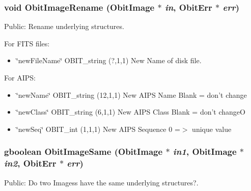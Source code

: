 \subsubsection{\setlength{\rightskip}{0pt plus 5cm}void Obit\-Image\-Rename ({\bf Obit\-Image} $\ast$ {\em in}, {\bf Obit\-Err} $\ast$ {\em err})}\label{ObitImage_8c_a15}


Public: Rename underlying structures. 

For FITS files: \begin{itemize}
\item \char`\"{}new\-File\-Name\char`\"{} OBIT\_\-string (?,1,1) New Name of disk file.\end{itemize}
For AIPS: \begin{itemize}
\item \char`\"{}new\-Name\char`\"{} OBIT\_\-string (12,1,1) New AIPS Name Blank = don't change \item \char`\"{}new\-Class\char`\"{} OBIT\_\-string (6,1,1) New AIPS Class Blank = don't change\-O \item \char`\"{}new\-Seq\char`\"{} OBIT\_\-int (1,1,1) New AIPS Sequence 0 =$>$ unique value 
\end{itemize}
\subsubsection{\setlength{\rightskip}{0pt plus 5cm}gboolean Obit\-Image\-Same ({\bf Obit\-Image} $\ast$ {\em in1}, {\bf Obit\-Image} $\ast$ {\em in2}, {\bf Obit\-Err} $\ast$ {\em err})}\label{ObitImage_8c_a13}


Public: Do two Imagess have the same underlying structures?. 

